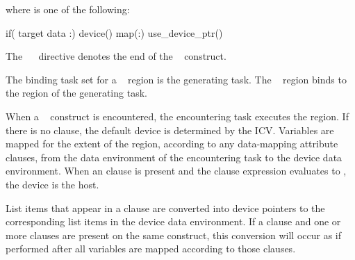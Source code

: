 where  is one of the following:

\begin{indentedcodelist}
if(\plc{[} target data :\plc{] scalar-logical-expression})
device()
map(\plc{[[map-type-modifier[,]] map-type}:\plc{ ] list})
use\_device\_ptr()
\end{indentedcodelist}

The ~~ directive denotes the end of the ~ construct.
\fortranspecificend

\binding
The binding task set for a ~ region is the generating task. The 
~ region binds to the region of the generating task.

\descr
When a ~ construct is encountered, the encountering task executes the region. If there is no  clause, the default device is determined by the  ICV. Variables are mapped for the extent of the region, according to any data-mapping attribute clauses, from the data environment of the encountering task to the device data environment. When an  clause is present and the  clause expression evaluates to , the device is the host.

List items that appear in a  clause are converted into
device pointers to the corresponding list items in the device data environment.
If a  clause and one or more  clauses are
present on the same construct, this conversion will occur as if performed after
all variables are mapped according to those  clauses.


